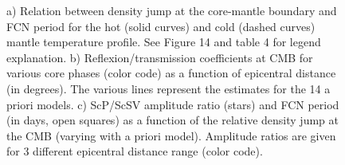 \begin{figure}[hp!]
\begin{center}


\caption{{a) Relation between density jump at the core-mantle boundary and FCN period for the hot (solid curves) and cold (dashed curves) mantle temperature profile. See Figure 14 and table 4 for legend explanation.
b) Reflexion/transmission coefficients at CMB for various core phases (color code) as a function of epicentral distance (in degrees). The various lines represent the estimates for the 14 a priori models.
c) ScP/ScSV amplitude ratio (stars) and FCN period (in days, open squares) as a function of the relative density jump at the CMB (varying with a priori model). Amplitude ratios are given for 3 different epicentral distance range (color code).}}
\label{fig:figabc}
\end{center}
\end{figure}

